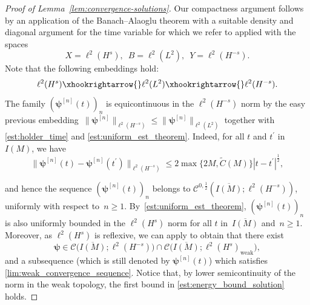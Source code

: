 \documentclass[12pt,a4paper]{amsart}
\numberwithin{equation}{section}
\newcommand{\ulpsi}{\boldsymbol{\psi}}
\begin{document}
	\begin{proof}[Proof of Lemma~\ref{lem:convergence-solutions}]
		Our compactness argument follows by an application of the Banach--Alaoglu theorem with a suitable density and diagonal argument for the time variable for which we refer to \cite[Proposition 1.1.2]{cazenave2003semilinear} applied with the spaces
		\begin{equation}\label{def:space_choices_XBY}
			X = \ell^2(H^{s}), \;\ B=\ell^2(L^2) , \;\ Y= \ell^2(H^{-s}).
		\end{equation}
		Note that the following embeddings hold:
		\begin{equation}
			\ell^2(H^{s}) \xhookrightarrow{} \ell^2(L^2) \xhookrightarrow{} \ell^2(H^{-s}) .
		\end{equation}
		The family $( \ulpsi^{[n]}(t) )_n $ is equicontinuous in the $ \ell^2(H^{-s}) $ norm by the easy previous embedding~$ \| \ulpsi^{[n]} \|_{\ell^2(H^{-s})} \leq \| \ulpsi^{[n]} \|_{\ell^2(L^2)} $ together with \eqref{est:holder_time} and \eqref{est:uniform_est_theorem}. Indeed, for all $t$ and $t^\prime$ in $I(M)$, we have
		\begin{equation}
			\| \ulpsi^{[n]}(t) - \ulpsi^{[n]}(t^\prime) \|_{\ell^2(H^{-s})} \leq 2 \max\{2M, \tilde{C}(M)\} |t-t^\prime|^{\frac{1}{2}} ,
		\end{equation}

		and hence the sequence $ (\ulpsi^{[n]}(t))_n$ belongs to $\mathscr{C}^{0,\frac{1}{2}}(\overline{I(M)};\ell^2(H^{-s}))$, uniformly with respect to~$ n \geq 1$. By~\eqref{est:uniform_est_theorem}, $ (\ulpsi^{[n]}(t))_n$ is also uniformly bounded in the $ \ell^2(H^{s}) $ norm for all $ t$ in~$\overline{I(M)}$ and~$ n \geq 1$. Moreover, as $ \ell^2(H^{s}) $ is reflexive, we can apply \cite[Proposition 1.1.2]{cazenave2003semilinear} to obtain that there exist
		\begin{equation}
			\ulpsi \in \mathscr{C}\big(\overline{I(M)}; \ell^2(H^{-s})\big)\cap \mathscr{C}\big(\overline{I(M)}; \ell^2(H^{s})_{\mathrm{weak}}\big),
		\end{equation}
		and a subsequence (which is still denoted by $\ulpsi^{[n]}(t)$) 
		which satisfies \eqref{lim:weak_convergence_sequence}. 
		Notice that, by lower semicontinuity of the norm in the weak topology, the first bound in \eqref{est:energy_bound_solution} holds.
		

\end{proof}
\end{document}
